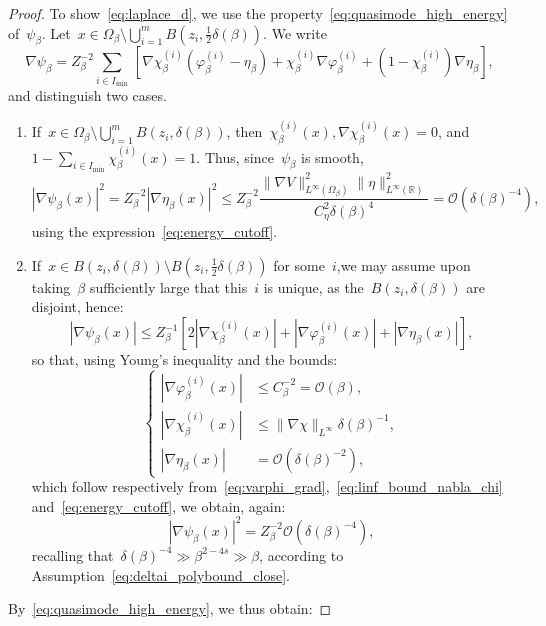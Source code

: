 \documentclass[10pt]{article}
\newcommand{\R}{\mathbb{R}}
\newcommand{\1}{\mathbbm 1}
\newcommand{\largeRadius}{\delta}
\newcommand{\localCutoff}[1]{\chi_\beta^{(#1)}} %
\newcommand{\deltaScalingExp}{s}
\newcommand{\energyCutoffConst}{C_\eta}
\renewcommand{\O}{\mathcal{O}}
\begin{document}
\begin{proof}
            To show~\eqref{eq:laplace_d}, we use the property~\eqref{eq:quasimode_high_energy} of~$\psi_\beta$.
            Let~$x\in\Omega_\beta \setminus \bigcup_{i=1}^m B\left(z_i,\frac12\largeRadius(\beta)\right)$. We write
            \[\nabla \psi_\beta = Z_\beta^{-2}\sum_{i\in I_{\min}}\,\left[\nabla \localCutoff{i} (\varphi_\beta^{(i)}-\eta_\beta) + \localCutoff{i}\nabla\varphi_\beta^{(i)} + (1-\localCutoff{i})\nabla \eta_\beta\right],\]
            and distinguish two cases.
            \begin{enumerate}[-]
                \item{If~$x\in \Omega_\beta \setminus \bigcup_{i=1}^m B(z_i,\largeRadius(\beta))$, then~$\localCutoff{i}(x),\nabla\localCutoff{i}(x) = 0$, and~$1-\sum_{i\in I_{\min}} \localCutoff{i}(x) = 1$. Thus, since~$\psi_\beta$ is smooth,
                $$|\nabla \psi_\beta(x)|^2 = Z_\beta^{-2}|\nabla \eta_\beta(x)|^2 \leq Z_\beta^{-2}\frac{\|\nabla V\|^2_{L^\infty(\Omega_\beta)}\|\eta\|^2_{L^\infty(\R)}}{\energyCutoffConst^2\largeRadius(\beta)^4}=\O(\largeRadius(\beta)^{-4}),$$
                using the expression~\eqref{eq:energy_cutoff}.}
                \item{If~$x\in B(z_i,\largeRadius(\beta))\setminus B\left(z_i,\frac12\largeRadius(\beta)\right)$ for some~$i$,we may assume upon taking~$\beta$ sufficiently large that this~$i$ is unique, as the~$B(z_i,\largeRadius(\beta))$ are disjoint, hence:
                \[|\nabla \psi_\beta(x)| \leq Z_\beta^{-1} \left[2|\nabla \localCutoff{i}(x)| + |\nabla \varphi_\beta^{(i)}(x)| + |\nabla \eta_\beta(x)|\right],\]
                so that, using Young's inequality and the bounds:
                \[\left\{\begin{aligned}
                    |\nabla \varphi_\beta^{(i)}(x)| &\leq C_\beta^{-2} = \O(\beta),\\
                    |\nabla \localCutoff{i}(x)| &\leq \|\nabla \chi\|_{L^\infty}\largeRadius(\beta)^{-1},\\
                    |\nabla \eta_\beta(x)| &= \O(\largeRadius(\beta)^{-2}),
                \end{aligned}\right.\]
                which follow respectively from~\eqref{eq:varphi_grad},~\eqref{eq:linf_bound_nabla_chi} and~\eqref{eq:energy_cutoff}, we obtain, again:
                \begin{equation}
                    |\nabla \psi_\beta(x)|^2 = Z_\beta^{-2}\O(\largeRadius(\beta)^{-4}),
                \end{equation}
                recalling that~$\largeRadius(\beta)^{-4}\gg \beta^{2-4\deltaScalingExp}\gg \beta$, according to Assumption~\ref{eq:deltai_polybound_close}.
                }
            \end{enumerate}
            By~\eqref{eq:quasimode_high_energy}, we thus obtain:


\end{proof}
\end{document}
